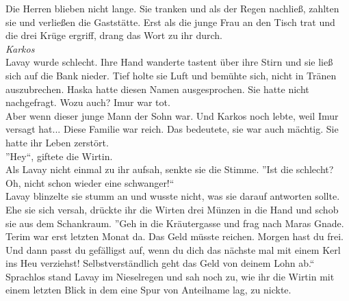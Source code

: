 Die Herren blieben nicht lange. Sie tranken und als der Regen nachließ, zahlten sie und verließen 
die Gaststätte. Erst als die junge Frau an den Tisch trat und die drei Krüge ergriff, drang das 
Wort zu ihr durch.\\
\textit{Karkos}\\
Lavay wurde schlecht. Ihre Hand wanderte tastent über ihre Stirn und sie ließ sich auf die Bank 
nieder. Tief holte sie Luft und bemühte sich, nicht in Tränen auszubrechen. Haska hatte diesen 
Namen ausgesprochen. Sie hatte nicht nachgefragt. Wozu auch? Imur war tot.\\
Aber wenn dieser junge Mann der Sohn war. Und Karkos noch lebte, weil Imur versagt hat... Diese 
Familie war reich. Das bedeutete, sie war auch mächtig. Sie hatte ihr Leben zerstört.\\
''Hey``, giftete die Wirtin.\\
Als Lavay nicht einmal zu ihr aufsah, senkte sie die Stimme. ''Ist die schlecht? Oh, nicht schon 
wieder eine schwanger!``\\
Lavay blinzelte sie stumm an und wusste nicht, was sie darauf antworten sollte. Ehe sie sich 
versah, drückte ihr die Wirten drei Münzen in die Hand und schob sie aus dem Schankraum. ''Geh in 
die Kräutergasse und frag nach Maras Gnade. Terim war erst letzten Monat da. Das Geld müsste 
reichen. Morgen hast du frei. Und dann passt du gefälligst auf, wenn du dich das nächste mal mit 
einem Kerl ins Heu verziehst! Selbstverständlich geht das Geld von deinem Lohn ab.``\\
Sprachlos stand Lavay im Nieselregen und sah noch zu, wie ihr die Wirtin mit einem letzten Blick in 
dem eine Spur von Anteilname lag, zu nickte. 

